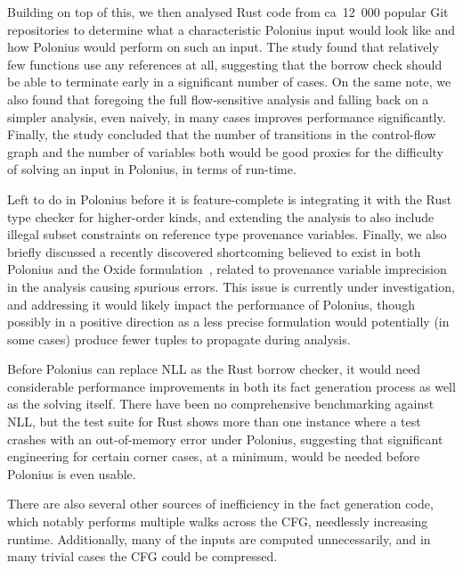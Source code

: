 \documentclass[11pt,a4paper,twoside,openany]{report}
\begin{document}
Building on top of this, we then analysed Rust code from ca~12~000 popular Git
repositories to determine what a characteristic Polonius input would look like
and how Polonius would perform on such an input. The study found that relatively
few functions use any references at all, suggesting that the borrow check should
be able to terminate early in a significant number of cases. On the same note,
we also found that foregoing the full flow-sensitive analysis and falling back
on a simpler analysis, even naively, in many cases improves performance
significantly. Finally, the study concluded that the number of transitions in
the control-flow graph and the number of variables both would be good proxies
for the difficulty of solving an input in Polonius, in terms of run-time.

Left to do in Polonius before it is feature-complete is integrating it with the
Rust type checker for higher-order kinds, and extending the analysis to also
include illegal subset constraints on reference type provenance variables.
Finally, we also briefly discussed a recently discovered shortcoming believed to
exist in both Polonius and the Oxide formulation~\cite{weiss_oxide:_2019},
related to provenance variable imprecision in the analysis causing spurious
errors. This issue is currently under investigation, and addressing it would
likely impact the performance of Polonius, though possibly in a positive
direction as a less precise formulation would potentially (in some cases)
produce fewer tuples to propagate during analysis.

Before Polonius can replace NLL as the Rust borrow checker, it would need
considerable performance improvements in both its fact generation process as
well as the solving itself. There have been no comprehensive benchmarking
against NLL, but the test suite for Rust shows more than one instance where a
test crashes with an out-of-memory error under Polonius, suggesting that
significant engineering for certain corner cases, at a minimum, would be needed
before Polonius is even usable.

There are also several other sources of inefficiency in the fact generation
code, which notably performs multiple walks across the CFG, needlessly
increasing runtime. Additionally, many of the inputs are computed unnecessarily,
and in many trivial cases the CFG could be compressed.
\end{document}
